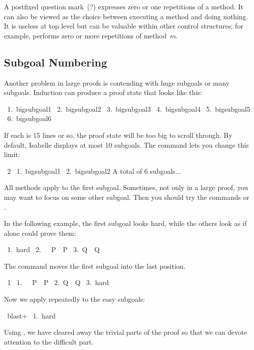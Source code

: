 A postfixed question mark~(\isa?) expresses zero or one
repetitions of a method.  It can also be viewed as the choice between executing a
method and doing nothing.  It is useless at top level but can be valuable
within other control structures; for example, 
 performs zero or more repetitions of method~$m$.%


\subsection{Subgoal Numbering}

Another problem in large proofs is contending with huge
subgoals or many subgoals.  Induction can produce a proof state that looks
like this:
\begin{isabelle}
\ 1.\ bigsubgoal1\isanewline
\ 2.\ bigsubgoal2\isanewline
\ 3.\ bigsubgoal3\isanewline
\ 4.\ bigsubgoal4\isanewline
\ 5.\ bigsubgoal5\isanewline
\ 6.\ bigsubgoal6
\end{isabelle}
If each  is 15 lines or so, the proof state will be too big to
scroll through.  By default, Isabelle displays at most 10 subgoals.  The 
 command lets you change this limit:
\begin{isabelle}
\ 2\isanewline
\ 1.\ bigsubgoal1\isanewline
\ 2.\ bigsubgoal2\isanewline
A total of 6 subgoals...
\end{isabelle}

\medskip
All methods apply to the first subgoal.
Sometimes, not only in a large proof, you may want to focus on some other
subgoal.  Then you should try the commands  or .

In the following example, the first subgoal looks hard, while the others
look as if  alone could prove them:
\begin{isabelle}
\ 1.\ hard\isanewline
\ 2.\ \isasymnot \ \isasymnot \ P\ \isasymLongrightarrow \ P\isanewline
\ 3.\ Q\ \isasymLongrightarrow \ Q%
\end{isabelle}
%
The  command moves the first subgoal into the last position.
\begin{isabelle}
\ 1\isanewline
\ 1.\ \isasymnot \ \isasymnot \ P\ \isasymLongrightarrow \ P\isanewline
\ 2.\ Q\ \isasymLongrightarrow \ Q\isanewline
\ 3.\ hard%
\end{isabelle}
%
Now we apply  repeatedly to the easy subgoals:
\begin{isabelle}
\ blast+\isanewline
\ 1.\ hard%
\end{isabelle}
Using , we have cleared away the trivial parts of the proof so
that we can devote attention to the difficult part.

